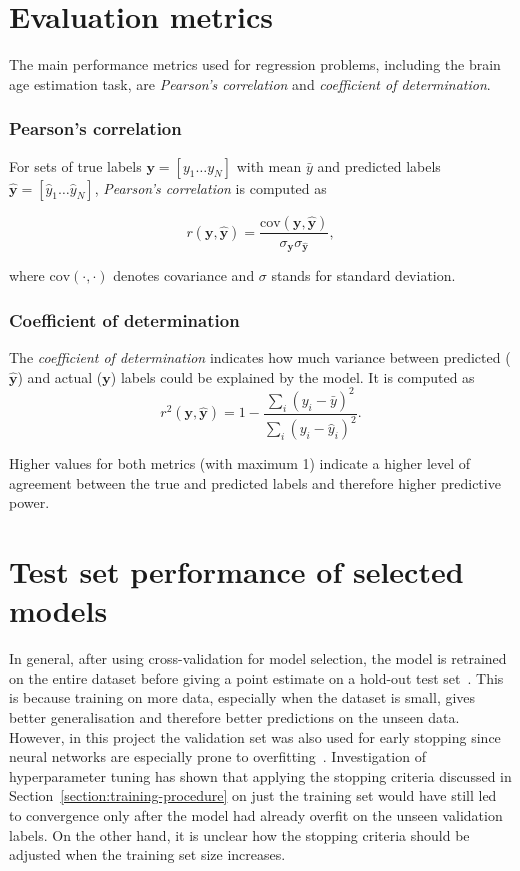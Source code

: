 \section{Evaluation metrics}
\label{section:evaluation-metrics}
The main performance metrics used for regression problems, including the brain age estimation task, are \textit{Pearson's correlation} and \textit{coefficient of determination}.

\subsubsection{Pearson's correlation}
For sets of true labels $\mathbf{y}  = [y_1 \dots y_N]$ with mean $\bar{y}$ and predicted labels $\mathbf{\hat{y}} = [\hat{y}_1 \dots \hat{y}_N]$, \textit{Pearson's correlation} is computed as

\begin{equation}
    r(\mathbf{y}, \mathbf{\hat{y}}) = \frac{\mathrm{cov}(\mathbf{y}, \mathbf{\hat{y}})}{\sigma_{\mathbf{y}} \sigma_{\mathbf{\hat{y}}}},
\end{equation}

where $\mathrm{cov}(\cdot, \cdot)$ denotes covariance and $\sigma$ stands for standard deviation. 

\subsubsection{Coefficient of determination}
The \textit{coefficient of determination} indicates how much variance between predicted ($\mathbf{\hat{y}}$) and actual ($\mathbf{y}$) labels could be explained by the model. It is computed as 
\begin{equation}
    r^2(\mathbf{y}, \mathbf{\hat{y}}) = 1 - \frac{\sum_{i} (y_i - \bar{y})^2}{\sum_{i} (y_i - \hat{y}_i)^2}.
\end{equation}

Higher values for both metrics (with maximum 1) indicate a higher level of agreement between the true and predicted labels and therefore higher predictive power.


\section{Test set performance of selected models}
\label{section:test-set-performance}
In general, after using cross-validation for model selection, the model is retrained on the entire dataset before giving a point estimate on a hold-out test set~\cite{raschka2018model}. This is because training on more data, especially when the dataset is small, gives better generalisation and therefore better predictions on the unseen data. However, in this project the validation set was also used for early stopping since neural networks are especially prone to overfitting~\cite{prechelt1998automatic}. Investigation of hyperparameter tuning has shown that applying the stopping criteria discussed in Section~\ref{section:training-procedure} on just the training set would have still led to convergence only after the model had already overfit on the unseen validation labels. On the other hand, it is unclear how the stopping criteria should be adjusted when the training set size increases. 

